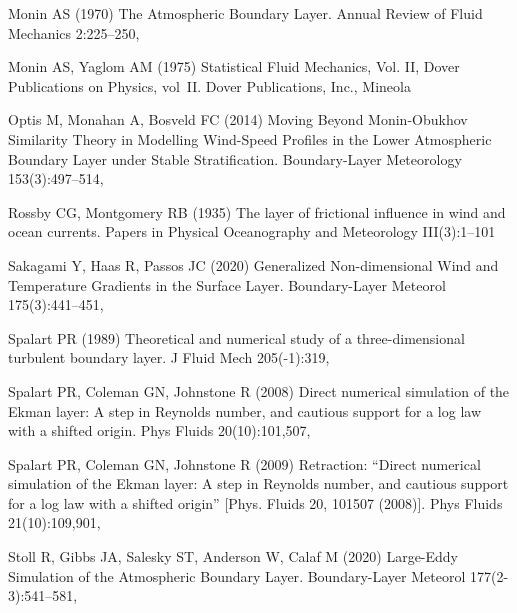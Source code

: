 \documentclass[smallcondensed,final]{svjour3}
\begin{document}
\begin{thebibliography}{57}
Monin AS (1970) The {{Atmospheric Boundary Layer}}. Annual Review of Fluid
  Mechanics 2:225--250, 

Monin AS, Yaglom AM (1975) Statistical {{Fluid Mechanics}}, {{Vol}}. {{II}},
  Dover {{Publications}} on {{Physics}}, vol~II. Dover Publications, Inc.,
  Mineola

Optis M, Monahan A, Bosveld FC (2014) Moving {{Beyond Monin-Obukhov Similarity
  Theory}} in {{Modelling Wind-Speed Profiles}} in the {{Lower Atmospheric
  Boundary Layer}} under {{Stable Stratification}}. Boundary-Layer Meteorology
  153(3):497--514, 

Rossby CG, Montgomery RB (1935) The layer of frictional influence in wind and
  ocean currents. Papers in Physical Oceanography and Meteorology III(3):1--101

Sakagami Y, Haas R, Passos JC (2020) Generalized {{Non-dimensional Wind}} and
  {{Temperature Gradients}} in the {{Surface Layer}}. Boundary-Layer Meteorol
  175(3):441--451, 

Spalart PR (1989) Theoretical and numerical study of a three-dimensional
  turbulent boundary layer. J Fluid Mech 205(-1):319,

Spalart PR, Coleman GN, Johnstone R (2008) Direct numerical simulation of the
  {{Ekman}} layer: {{A}} step in {{Reynolds}} number, and cautious support for
  a log law with a shifted origin. Phys Fluids 20(10):101,507,

Spalart PR, Coleman GN, Johnstone R (2009) Retraction: ``{{Direct}} numerical
  simulation of the {{Ekman}} layer: {{A}} step in {{Reynolds}} number, and
  cautious support for a log law with a shifted origin'' [{{Phys}}. {{Fluids}}
  20, 101507 (2008)]. Phys Fluids 21(10):109,901, 

Stoll R, Gibbs JA, Salesky ST, Anderson W, Calaf M (2020) Large-{{Eddy
  Simulation}} of the {{Atmospheric Boundary Layer}}. Boundary-Layer Meteorol
  177(2-3):541--581, 


\end{thebibliography}
\end{document}
